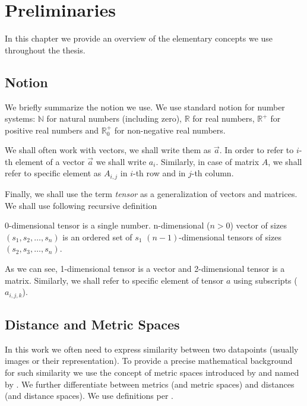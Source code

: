 \chapter{Preliminaries}


In this chapter we provide an overview of the elementary concepts we use
throughout the thesis.

\section{Notion}

We briefly summarize the notion we use. We use standard notion for number
systems: $\mathbb{N}$ for natural numbers (including zero), $\mathbb{R}$ for
real numbers, $\mathbb{R}^+$ for positive real numbers and $\mathbb{R}^+_0$
for non-negative real numbers.

We shall often work with vectors, we shall write them as $\vec{a}$. In order
to refer to $i$-th element of a vector $\vec{a}$ we shall write $a_i$.
Similarly, in case of matrix $A$, we shall refer to specific element as
$A_{i,j}$ in $i$-th row and in $j$-th column.

Finally, we shall use the term \emph{tensor} as a generalization of vectors
and matrices. We shall use following recursive definition

\begin{defn}
0-dimensional tensor is a single number. n-dimensional ($n > 0$) vector of sizes
$(s_1, s_2, \ldots, s_n)$ is an ordered set of $s_1$ $(n-1)$-dimensional
tensors of sizes $(s_2, s_3, \ldots, s_n)$.
\end{defn}

As we can see, 1-dimensional tensor is a vector and 2-dimensional tensor is
a matrix. Similarly, we shall refer to specific element of tensor $a$ using
subscripts ($a_{i,j,k}$).

\section{Distance and Metric Spaces}
\label{sec:distances}

In this work we often need to express similarity between two datapoints
(usually images or their representation). To provide a precise mathematical
background for such similarity we use the concept of metric spaces introduced
by \cite{metric} and named by \cite{metricname}. We further differentiate
between metrics (and metric spaces) and distances (and distance spaces). We
use definitions per \cite{deza2009encyclopedia}.

